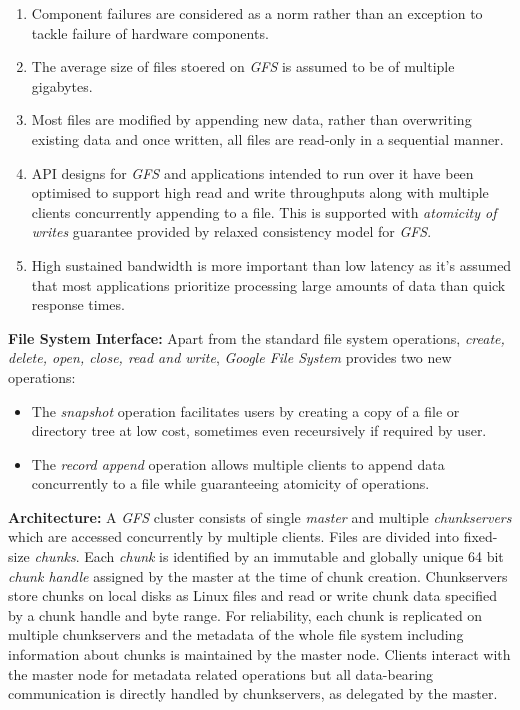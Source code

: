 \documentclass[12pt, a4paper]{article}
\begin{document}
\begin{enumerate}
\item Component failures are considered as a norm rather than an exception to tackle failure of hardware components.

\item The average size of files stoered on \textit{GFS}\cite{Ghemawat:2003:GFS:945445.945450} is assumed to be of multiple gigabytes.

\item Most files are modified by appending new data, rather than overwriting existing data and once written, all files are read-only in a sequential manner.

\item API designs for \textit{GFS}\cite{Ghemawat:2003:GFS:945445.945450} and applications intended to run over it have been optimised to support high read and write throughputs along with multiple clients concurrently appending to a file. This is supported with \textit{atomicity of writes} guarantee provided by relaxed consistency model for \textit{GFS}\cite{Ghemawat:2003:GFS:945445.945450}.

\item High sustained bandwidth is more important than low latency as it's assumed that most applications prioritize processing large amounts of data than quick response times.
\end{enumerate}

\textbf{File System Interface:} Apart from the standard file system operations, \textit{create, delete, open, close, read and write}, \textit{Google File System}\cite{Ghemawat:2003:GFS:945445.945450} provides two new operations:

\begin{itemize}
\item The \textit{snapshot} operation facilitates users by creating a copy of a file or directory tree at low cost, sometimes even receursively if required by user.

\item The \textit{record append} operation allows multiple clients to append data concurrently to a file while guaranteeing atomicity of operations.
\end{itemize}

\textbf{Architecture:} A \textit{GFS}\cite{Ghemawat:2003:GFS:945445.945450} cluster consists of single \textit{master} and multiple \textit{chunkservers} which are accessed concurrently by multiple clients. Files are divided into fixed-size \textit{chunks}. Each \textit{chunk} is identified by an immutable and globally unique 64 bit \textit{chunk handle} assigned by the master at the time of chunk creation. Chunkservers store chunks on local disks as Linux files and read or write chunk data specified by a chunk handle and byte range. For reliability, each chunk is replicated on multiple chunkservers and the metadata of the whole file system including information about chunks is maintained by the master node. Clients interact with the master node for metadata related operations but all data-bearing communication is directly handled by chunkservers, as delegated by the master.\par
\end{document}
